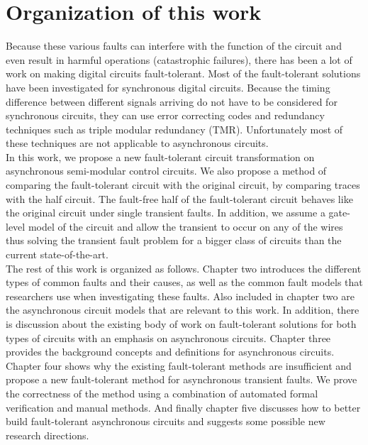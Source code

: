 \documentclass[12pt]{report}
\begin{document}
\section{Organization of this work}
Because these various faults can interfere with the function of the circuit and even result in harmful operations (catastrophic failures), there has been a lot of work on making digital circuits fault-tolerant. Most of the fault-tolerant solutions have been investigated for synchronous digital circuits.  Because the timing difference between different signals arriving do not have to be considered for synchronous circuits, they can use error correcting codes and redundancy techniques such as triple modular redundancy (TMR). Unfortunately most of these techniques are not applicable to asynchronous circuits.\\

In this work, we propose a new fault-tolerant circuit transformation on asynchronous semi-modular control circuits.  We also propose a method of comparing the fault-tolerant circuit with the original circuit, by comparing traces with the half circuit.  The fault-free half of the fault-tolerant circuit behaves like the original circuit under single transient faults.  In addition, we assume a gate-level model of the circuit and allow the transient to occur on any of the wires thus solving the transient fault problem for a bigger class of circuits than the current state-of-the-art.\\

The rest of this work is organized as follows.  Chapter two introduces the different types of common faults and their causes, as well as the common fault models that researchers use when investigating these faults.  Also included in chapter two are the asynchronous circuit models that are relevant to this work.  In addition, there is discussion about the existing body of work on fault-tolerant solutions for both types of circuits with an emphasis on asynchronous circuits.  Chapter three provides the background concepts and definitions for asynchronous circuits.  Chapter four shows why the existing fault-tolerant methods are insufficient and propose a new fault-tolerant method for asynchronous transient faults.  We prove the correctness of the method using a combination of automated formal verification and manual methods.  And finally chapter five discusses how to better build fault-tolerant asynchronous circuits and suggests some possible new research directions.
\end{document}
